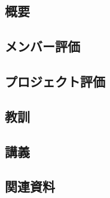 \documentclass[11pt,a4paper]{jsarticle}
\begin{document}
\subsection{概要}
\subsection{メンバー評価}
\subsection{プロジェクト評価}
\subsection{教訓}
\subsection{講義}
\subsection{関連資料}
\end{document}
